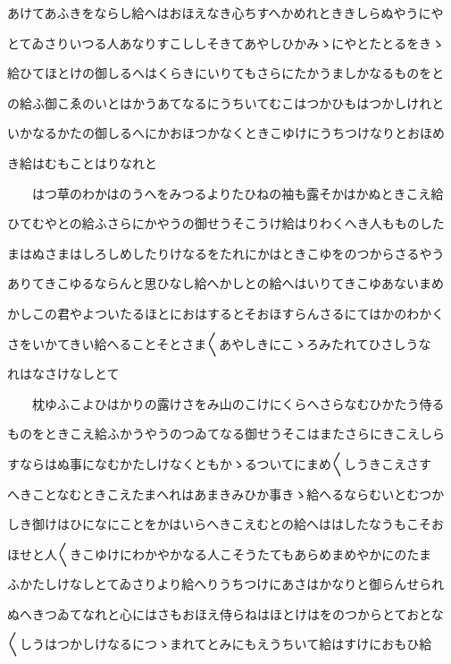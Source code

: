 \documentclass[a4paper,11pt,landscape]{ltjtarticle}
\begin{document}
あけてあふきをならし給へはおほえなき心ちすへかめれとききしらぬやうにや
\par\medskip
とてゐさりいつる人あなりすこししそきてあやしひかみゝにやとたとるをきゝ
\par\medskip
給ひてほとけの御しるへはくらきにいりてもさらにたかうましかなるものをと
\par\medskip
の給ふ御こゑのいとはかうあてなるにうちいてむこはつかひもはつかしけれと
\par\medskip
いかなるかたの御しるへにかおほつかなくときこゆけにうちつけなりとおほめ
\par\medskip
き給はむもことはりなれと
\par\medskip
　　はつ草のわかはのうへをみつるよりたひねの袖も露そかはかぬときこえ給
\par\medskip
ひてむやとの給ふさらにかやうの御せうそこうけ給はりわくへき人もものした
\par\medskip
まはぬさまはしろしめしたりけなるをたれにかはときこゆをのつからさるやう
\par\medskip
ありてきこゆるならんと思ひなし給へかしとの給へはいりてきこゆあないまめ
\par\medskip
かしこの君やよついたるほとにおはするとそおほすらんさるにてはかのわかく
\par\medskip
さをいかてきい給へることそとさま〱あやしきにこゝろみたれてひさしうな
\par\medskip
れはなさけなしとて
\par\medskip
　　枕ゆふこよひはかりの露けさをみ山のこけにくらへさらなむひかたう侍る
\par\medskip
ものをときこえ給ふかうやうのつゐてなる御せうそこはまたさらにきこえしら
\par\medskip
すならはぬ事になむかたしけなくともかゝるついてにまめ〱しうきこえさす
\par\medskip
へきことなむときこえたまへれはあまきみひか事きゝ給へるならむいとむつか
\par\medskip
しき御けはひになにことをかはいらへきこえむとの給へははしたなうもこそお
\par\medskip
ほせと人〱きこゆけにわかやかなる人こそうたてもあらめまめやかにのたま
\par\medskip
ふかたしけなしとてゐさりより給へりうちつけにあさはかなりと御らんせられ
\par\medskip
ぬへきつゐてなれと心にはさもおほえ侍らねはほとけはをのつからとておとな
\par\medskip
〱しうはつかしけなるにつゝまれてとみにもえうちいて給はすけにおもひ給
\par\medskip
\end{document}
